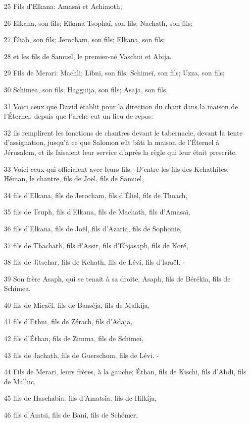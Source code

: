 \par 25 Fils d'Elkana: Amasaï et Achimoth;
\par 26 Elkana, son fils; Elkana Tsophaï, son fils; Nachath, son fils;
\par 27 Éliab, son fils; Jerocham, son fils; Elkana, son fils;
\par 28 et les fils de Samuel, le premier-né Vaschni et Abija.
\par 29 Fils de Merari: Machli; Libni, son fils; Schimeï, son fils; Uzza, son fils;
\par 30 Schimea, son fils; Hagguija, son fils; Asaja, son fils.
\par 31 Voici ceux que David établit pour la direction du chant dans la maison de l'Éternel, depuis que l'arche eut un lieu de repos:
\par 32 ils remplirent les fonctions de chantres devant le tabernacle, devant la tente d'assignation, jusqu'à ce que Salomon eût bâti la maison de l'Éternel à Jérusalem, et ils faisaient leur service d'après la règle qui leur était prescrite.
\par 33 Voici ceux qui officiaient avec leurs fils. -D'entre les fils des Kehathites: Héman, le chantre, fils de Joël, fils de Samuel,
\par 34 fils d'Elkana, fils de Jerocham, fils d'Éliel, fils de Thoach,
\par 35 fils de Tsuph, fils d'Elkana, fils de Machath, fils d'Amasaï,
\par 36 fils d'Elkana, fils de Joël, fils d'Azaria, fils de Sophonie,
\par 37 fils de Thachath, fils d'Assir, fils d'Ebjasaph, fils de Koré,
\par 38 fils de Jitsehar, fils de Kehath, fils de Lévi, fils d'Israël. -
\par 39 Son frère Asaph, qui se tenait à sa droite, Asaph, fils de Bérékia, fils de Schimea,
\par 40 fils de Micaël, fils de Baaséja, fils de Malkija,
\par 41 fils d'Ethni, fils de Zérach, fils d'Adaja,
\par 42 fils d'Éthan, fils de Zimma, fils de Schimeï,
\par 43 fils de Jachath, fils de Guerschom, fils de Lévi. -
\par 44 Fils de Merari, leurs frères, à la gauche; Éthan, fils de Kischi, fils d'Abdi, fils de Malluc,
\par 45 fils de Haschabia, fils d'Amatsia, fils de Hilkija,
\par 46 fils d'Amtsi, fils de Bani, fils de Schémer,
